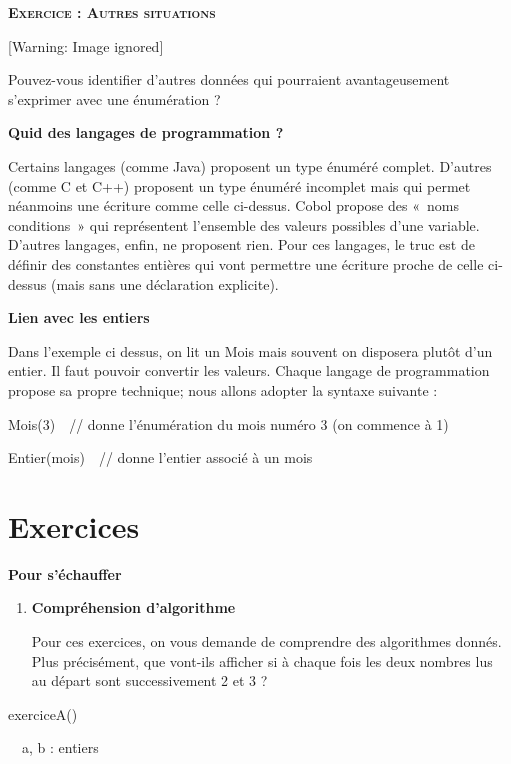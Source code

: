 {\sffamily\bfseries\scshape
Exercice : Autres situations}

\begin{center}
 [Warning: Image ignored] %

\end{center}
{
Pouvez-vous identifier d'autres données qui pourraient
avantageusement s'exprimer avec une énumération ?}

{\bfseries
Quid des langages de programmation ?}

{
Certains langages (comme Java) proposent un type énuméré complet.
D'autres (comme C et C++) proposent un type énuméré
incomplet mais qui permet néanmoins une écriture comme celle ci-dessus.
Cobol propose des «~noms conditions~» qui représentent
l'ensemble des valeurs possibles
d'une variable. D'autres langages,
enfin, ne proposent rien. Pour ces langages, le truc est de définir des
constantes entières qui vont permettre une écriture proche de celle
ci-dessus (mais sans une déclaration explicite).}

{\bfseries
Lien avec les entiers}

{
Dans l'exemple ci dessus, on lit un Mois mais souvent
on disposera plutôt d'un entier. Il faut pouvoir
convertir les valeurs. Chaque langage de programmation propose sa
propre technique; nous allons adopter la syntaxe suivante :}

{\sffamily
Mois(3)\ \ // donne l'énumération du mois numéro 3 (on
commence à 1)}

{\sffamily
Entier(mois)\ \ // donne l'entier associé à un mois}

\section{Exercices}
{\sffamily\bfseries\upshape
Pour s'échauffer}

\liststyleExercice
\begin{enumerate}
\item {\sffamily\bfseries
Compréhension d'algorithme}

{
Pour ces exercices, on vous demande de comprendre des algorithmes
donnés. Plus précisément, que vont-ils afficher si à chaque fois les
deux nombres lus au départ sont successivement 2 et 3 ?}
\end{enumerate}
{\sffamily
{} exerciceA()}

{\sffamily
\ \ a, b : entiers}

